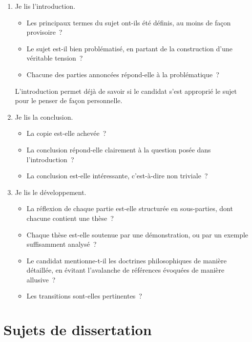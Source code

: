 \documentclass[a4paper]{article}
\begin{document}
\begin{enumerate}
\item Je lis l'introduction.

\begin{itemize}
\item Les principaux termes du sujet ont-ils été définis, au moins de
façon provisoire ?

\item Le sujet est-il bien problématisé, en partant de la construction
d'une véritable tension ?

\item Chacune des parties annoncées répond-elle à la problématique ?
\end{itemize}
L'introduction permet déjà de savoir si le candidat s'est approprié
le sujet pour le penser de façon personnelle.

\item Je lis la conclusion.

\begin{itemize}
\item La copie est-elle achevée ?

\item La conclusion répond-elle clairement à la question posée dans
l'introduction ?

\item La conclusion est-elle intéressante, c'est-à-dire non triviale ?
\end{itemize}

\item Je lis le développement.

\begin{itemize}
\item La réflexion de chaque partie est-elle structurée en sous-parties,
dont chacune contient une thèse ?

\item Chaque thèse est-elle soutenue par une démonstration, ou par un
exemple suffisamment analysé ?

\item Le candidat mentionne-t-il les doctrines philosophiques de manière
détaillée, en évitant l'avalanche de références évoquées de
manière allusive ?

\item Les transitions sont-elles pertinentes ?
\end{itemize}
\end{enumerate}

\section{Sujets de dissertation}
\label{sec-6}
\end{document}
